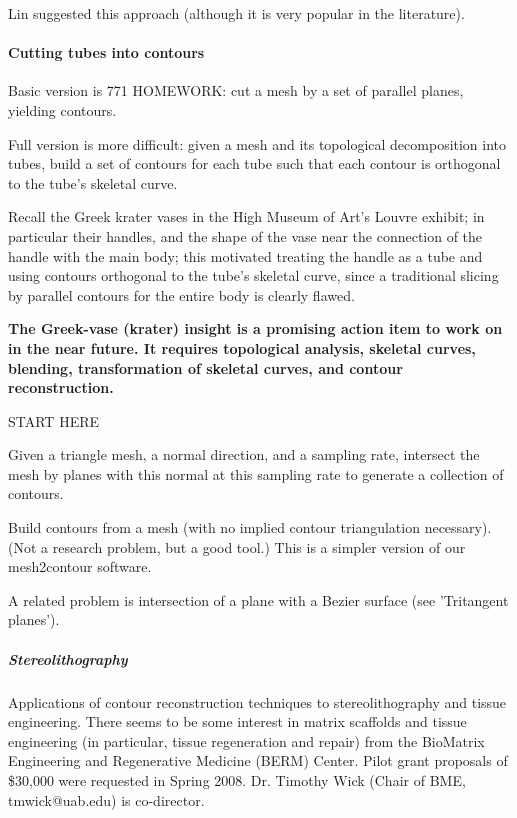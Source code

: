 \documentclass[11pt]{article}
\begin{document}
Lin suggested this approach (although it is very popular in the literature).


\paragraph{Cutting tubes into contours}

Basic version is 771 HOMEWORK: cut a mesh by a set of parallel planes, yielding contours.

Full version is more difficult: given a mesh and its topological decomposition into tubes,
build a set of contours for each tube such that each contour is orthogonal to the tube's
skeletal curve.

Recall the Greek krater vases in the High Museum of Art's Louvre exhibit; in particular
their handles, and the shape of the vase near the connection of the handle with the main body;
this motivated treating the handle as a tube and using contours orthogonal to the tube's
skeletal curve, since a traditional slicing by parallel contours for the entire body
is clearly flawed.

{\bf The Greek-vase (krater) insight is a promising action item to work on in the near future.
It requires topological analysis, skeletal curves, blending, transformation of skeletal curves,
and contour reconstruction.}

START HERE

Given a triangle mesh, a normal direction, and a sampling rate,
intersect the mesh by planes with this normal at this sampling rate
to generate a collection of contours.

Build contours from a mesh (with no implied contour triangulation necessary).
(Not a research problem, but a good tool.)
This is a simpler version of our mesh2contour software.

A related problem is intersection of a plane with a Bezier surface
(see 'Tritangent planes').


\subparagraph{Stereolithography}

Applications of contour reconstruction techniques to stereolithography
and tissue engineering.
There seems to be some interest in matrix scaffolds and tissue engineering (in particular,
tissue regeneration and repair) from the BioMatrix Engineering
and Regenerative Medicine (BERM) Center.
Pilot grant proposals of \$30,000 were requested in Spring 2008.
Dr. Timothy Wick (Chair of BME, tmwick@uab.edu) is co-director.
\end{document}
